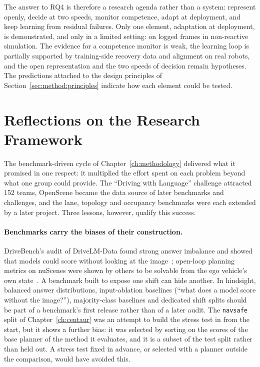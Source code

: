 The answer to RQ4 is therefore a research agenda rather than a system: represent openly, decide at two speeds, monitor competence, adapt at deployment, and keep learning from residual failures. Only one element, adaptation at deployment, is demonstrated, and only in a limited setting: on logged frames in non-reactive simulation. The evidence for a competence monitor is weak, the learning loop is partially supported by training-side recovery data and alignment on real robots, and the open representation and the two speeds of decision remain hypotheses. The predictions attached to the design principles of Section~\ref{sec:method:principles} indicate how each element could be tested.

\section{Reflections on the Research Framework}\label{sec:disc:method}

The benchmark-driven cycle of Chapter~\ref{ch:methodology} delivered what it promised in one respect: it multiplied the effort spent on each problem beyond what one group could provide. The ``Driving with Language'' challenge attracted 152 teams, OpenScene became the data source of later benchmarks and challenges, and the lane, topology and occupancy benchmarks were each extended by a later project. Three lessons, however, qualify this success.

\paragraph{Benchmarks carry the biases of their construction.} DriveBench's audit of DriveLM-Data found strong answer imbalance and showed that models could score without looking at the image~\cite{xie2025vlms}; open-loop planning metrics on nuScenes were shown by others to be solvable from the ego vehicle's own state~\cite{zhai2023rethinking,li2024ego}. A benchmark built to expose one shift can hide another. In hindsight, balanced answer distributions, input-ablation baselines (``what does a model score without the image?''), majority-class baselines and dedicated shift splits should be part of a benchmark's first release rather than of a later audit. The \texttt{navsafe} split of Chapter~\ref{ch:centaur} was an attempt to build the stress test in from the start, but it shows a further bias: it was selected by sorting on the scores of the base planner of the method it evaluates, and it is a subset of the test split rather than held out. A stress test fixed in advance, or selected with a planner outside the comparison, would have avoided this.

